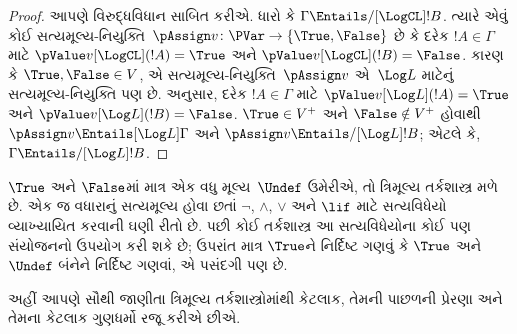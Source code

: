 \begin{proof}
  આપણે વિરુદ્ધવિધાન સાબિત કરીએ. ધારો કે $\Gamma \Entails/[\LogCL] !B$.
  ત્યારે એવું કોઈ સત્યમૂલ્ય-નિયુક્તિ~$\pAssign v\colon \PVar \to
  \{\True, \False\}$ છે કે દરેક $!A \in \Gamma$ માટે
  $\pValue v[\LogCL](!A) = \True$ અને
  $\pValue v[\LogCL](!B) = \False$. કારણ કે $\True,
  \False \in V$, એ સત્યમૂલ્ય-નિયુક્તિ~$\pAssign v$ એ~$\Log L$ માટેનું
  સત્યમૂલ્ય-નિયુક્તિ પણ છે.  અનુસાર, દરેક
  $!A \in \Gamma$ માટે $\pValue v[\Log L](!A) =
  \True$ અને $\pValue v[\Log L](!B) = \False$.
  $\True \in V^+$ અને $\False \notin V^+$ હોવાથી
  $\pAssign v \Entails[\Log L] \Gamma$ અને
  $\pAssign v \Entails/[\Log L] !B$; એટલે કે,
  $\Gamma \Entails/[\Log L] !B$.
\end{proof}
\endgroup


\OLEndChapterHook
\endgroup


\begingroup
\makeatletter{}\makeatother

\label{guunit:OLP-0392}


\begingroup
\makeatletter{}\makeatother


\label{guunit:OLP-0393}


$\True$ અને $\False$માં માત્ર એક વધુ મૂલ્ય~$\Undef$ ઉમેરીએ,
તો ત્રિમૂલ્ય તર્કશાસ્ત્ર મળે છે. એક જ વધારાનું સત્યમૂલ્ય
હોવા છતાં $\lnot$, $\land$, $\lor$ અને $\lif$ માટે
સત્યવિધેયો વ્યાખ્યાયિત કરવાની ઘણી રીતો છે. પછી કોઈ
તર્કશાસ્ત્ર આ સત્યવિધેયોના કોઈ પણ સંયોજનનો ઉપયોગ કરી શકે છે;
ઉપરાંત માત્ર $\True$ને નિર્દિષ્ટ ગણવું કે $\True$ અને~$\Undef$
બંનેને નિર્દિષ્ટ ગણવાં, એ પસંદગી પણ છે.

અહીં આપણે સૌથી જાણીતા ત્રિમૂલ્ય તર્કશાસ્ત્રોમાંથી કેટલાક,
તેમની પાછળની પ્રેરણા અને તેમના કેટલાક ગુણધર્મો રજૂ કરીએ છીએ.
\endgroup


\begingroup
\makeatletter{}\makeatother


\label{guunit:OLP-0394}



